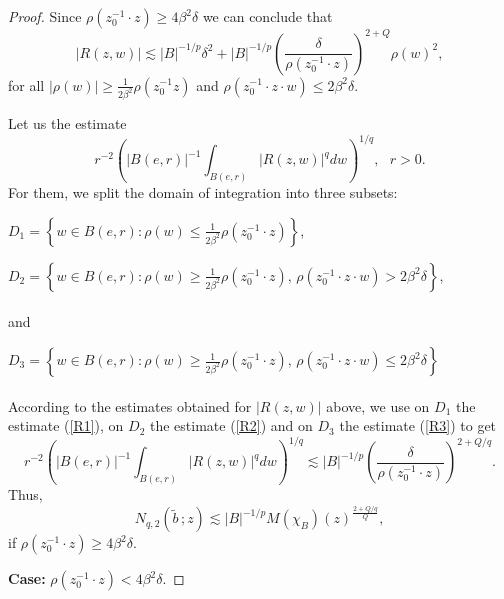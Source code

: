 \documentclass[reqno,10pt]{article}
\theoremstyle{definition}
\numberwithin{equation}{section}
\numberwithin{theorem}{section}
\begin{document}
\begin{proof}
Since $\rho(z_0^{-1} \cdot z) \geq 4 \beta^2 \delta$ we can conclude that
\begin{equation} \label{R3}
|R(z, w)| \lesssim  |B|^{-1/p} \delta^2 + |B|^{-1/p} \left( \frac{\delta}{\rho(z_0^{-1} \cdot z)} \right)^{2+Q} \rho(w)^{2}, 
\end{equation}
for all $|\rho(w)| \geq \frac{1}{2 \beta^2} \rho(z_0^{-1} z)$ and $\rho(z_0^{-1} \cdot z \cdot w) \leq 2 \beta^2 \delta$.

Let us the estimate
\[
r^{-2} \left( |B(e, r)|^{-1} \int_{B(e, r)} |R(z, w)|^{q} dw \right)^{1/q}, \,\,\,\, r > 0.
\]
For them, we split the domain of integration into three subsets:

\qquad

$D_1 = \left\{ w \in B(e, r) : \rho(w) \leq \frac{1}{2 \beta^2} \rho(z_0^{-1} \cdot z) \right\}$,

\qquad

$D_2 = \left\{ w \in B(e, r) : \rho(w) \geq \frac{1}{2 \beta^2} \rho(z_0^{-1} \cdot z), \, 
\rho(z_0^{-1} \cdot z \cdot w) > 2 \beta^2 \delta \right\},$
\\\\
and

\qquad

$D_3 = \left\{w \in B(e, r) : \rho(w) \geq \frac{1}{2 \beta^2} \rho(z_0^{-1} \cdot z), \, 
\rho(z_0^{-1} \cdot z \cdot w) \leq 2 \beta^2 \delta \right\}$
\\\\
According to the estimates obtained for $|R(z,w)|$ above, we use on $D_1$ the estimate (\ref{R1}), on $D_2$ the estimate (\ref{R2}) and on $D_3$ the estimate (\ref{R3}) to get
\[
r^{-2} \left( |B(e, r)|^{-1} \int_{B(e, r)} |R(z, w)|^{q} dw \right)^{1/q} \lesssim |B |^{-1/p} 
\left(\frac{\delta}{\rho(z_0^{-1} \cdot z)} \right)^{2+Q/q}.
\]
Thus,
\begin{equation}
N_{q, 2}\left(\widetilde{b} \, ; z \right) \lesssim |B |^{-1/p}  M(\chi_{B})(z)^{\frac{2+Q/q}{Q}}, \label{Nq3}
\end{equation}
if $\rho(z_0^{-1} \cdot z) \geq 4 \beta^2 \delta$.

\qquad

\textbf{Case:} $\rho(z_0^{-1} \cdot z) < 4 \beta^2 \delta$.


\qquad


\end{proof}
\end{document}
